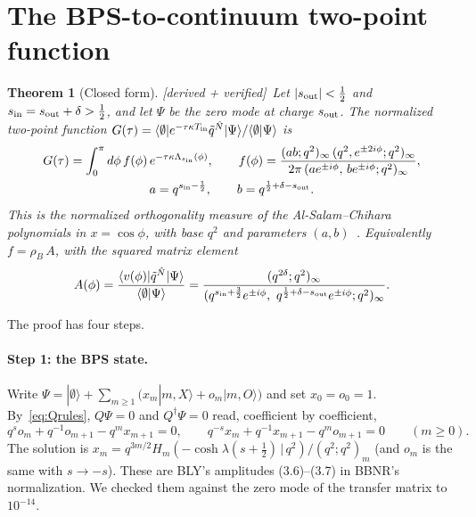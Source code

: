 \documentclass[11pt]{article}
\newcommand{\sI}{s_{\rm in}}
\newcommand{\sout}{s_{\rm out}}
\newcommand{\qt}{\tilde q}
\newcommand{\Nh}{\hat N}
\newcommand{\poch}[2]{(#1;#2)_\infty}
\newcommand{\tagbox}[2]{\textsf{\small\color{#1}[#2]}}
\newcommand{\VER}{\tagbox{cder}{derived + verified}}
\theoremstyle{plain}
\newtheorem{theorem}{Theorem}
\theoremstyle{remark}
\numberwithin{equation}{section}
\begin{document}
\section{The BPS-to-continuum two-point function}\label{sec:asc}

\begin{theorem}[Closed form]\label{thm:asc}\VER\
Let $|\sout|<\tfrac12$ and $\sI=\sout+\delta>\tfrac12$, and let $\Psi$ be the zero mode at charge $\sout$. The normalized
two-point function $G(\tau)=\langle\emptyset|e^{-\tau\kappa T_{\rm in}}\qt^{\Nh}|\Psi\rangle/\langle\emptyset|\Psi\rangle$
is
\begin{equation}\label{eq:asc}
\begin{gathered}
G(\tau)=\int_0^\pi d\phi\,f(\phi)\,e^{-\tau\kappa\Lambda_{\sI}(\phi)},\qquad
f(\phi)=\frac{\poch{ab}{q^2}\,\poch{q^2,e^{\pm2i\phi}}{q^2}}{2\pi\,\poch{ae^{\pm i\phi},\,be^{\pm i\phi}}{q^2}},\\
a=q^{\sI-\frac12},\qquad b=q^{\frac12+\delta-\sout}.
\end{gathered}
\end{equation}
This is the normalized orthogonality measure of the Al-Salam--Chihara polynomials in $x=\cos\phi$, with base $q^2$ and
parameters $(a,b)$~\cite{KLS}. Equivalently $f=\rho_B\,A$, with the squared matrix element
\begin{equation}\label{eq:A}
A(\phi)=\frac{\langle v(\phi)|\qt^{\Nh}|\Psi\rangle}{\langle\emptyset|\Psi\rangle}
=\frac{\poch{q^{2\delta}}{q^2}}{\poch{q^{\sI+\frac32}e^{\pm i\phi},\ q^{\frac12+\delta-\sout}e^{\pm i\phi}}{q^2}} .
\end{equation}
\end{theorem}

The proof has four steps.

\paragraph{Step 1: the BPS state.} Write
$\Psi=|\emptyset\rangle+\sum_{m\ge1}\big(x_m|m,X\rangle+o_m|m,O\rangle\big)$ and set $x_0=o_0=1$. By~\eqref{eq:Qrules},
$Q\Psi=0$ and $Q^\dagger\Psi=0$ read, coefficient by coefficient,
\begin{equation}\label{eq:gsrec}
q^{s}o_m+q^{-1}o_{m+1}-q^mx_{m+1}=0,\qquad q^{-s}x_m+q^{-1}x_{m+1}-q^mo_{m+1}=0\qquad(m\ge0).
\end{equation}
The solution is $x_m=q^{3m/2}H_m(-\cosh\lambda(s+\tfrac12)\,|\,q^2)/(q^2;q^2)_m$ (and $o_m$ is the same with $s\to-s$).
These are BLY's amplitudes (3.6)--(3.7) in BBNR's normalization. We checked them against the zero mode of the transfer
matrix to $10^{-14}$.
\end{document}

